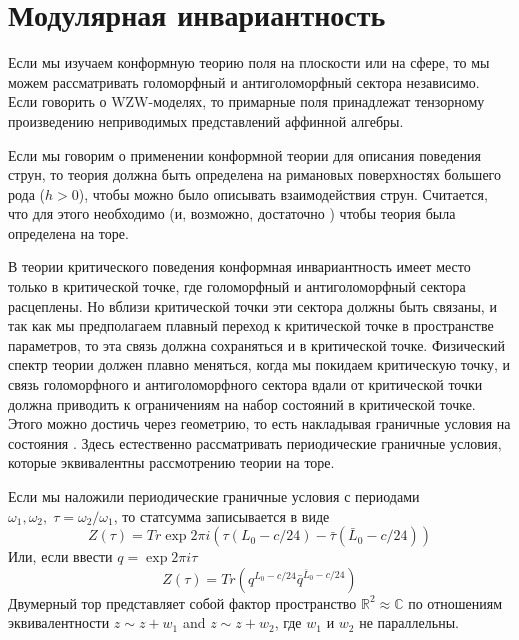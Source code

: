\documentclass[a4paper,12pt]{article}
\theoremstyle{definition} \newtheorem{Def}{Definition}
\begin{document}
\tableofcontents

\section{Модулярная инвариантность}
\label{sec:modular-invariance}

Если мы изучаем конформную теорию поля на плоскости или на сфере, то мы можем рассматривать голоморфный и антиголоморфный сектора независимо. Если говорить о WZW-моделях, то примарные поля принадлежат тензорному произведению неприводимых представлений аффинной алгебры.

Если мы говорим о применении конформной теории для описания поведения струн, то теория должна быть определена на римановых поверхностях большего рода ($h>0$), чтобы можно было описывать взаимодействия струн. Считается, что для этого необходимо (и, возможно, достаточно \cite{gaberdiel2000icf}) чтобы теория была определена на торе. 

В теории критического поведения конформная инвариантность имеет место только в критической точке, где голоморфный и антиголоморфный сектора расцеплены. Но вблизи критической точки эти сектора должны быть связаны, и так как мы предполагаем плавный переход к критической точке в пространстве параметров, то эта связь должна сохраняться и в критической точке. Физический спектр теории должен плавно меняться, когда мы покидаем критическую точку, и связь голоморфного и антиголоморфного сектора вдали от критической точки должна приводить к ограничениям на набор состояний в критической точке. Этого можно достичь через геометрию, то есть накладывая граничные условия на состояния \cite{difrancesco1997cft}. Здесь естественно рассматривать периодические граничные условия, которые эквивалентны рассмотрению теории на торе.

Если мы наложили периодические граничные условия с периодами $\omega_1, \omega_2,\; \tau=\omega_2/\omega_1$, то статсумма записывается в виде
\begin{equation}
  \label{eq:1}
  Z(\tau)=Tr \exp 2\pi i (\tau (L_0-c/24)-\bar{\tau} (\bar{L}_0-c/24))
\end{equation}
Или, если ввести $q=\exp 2\pi i \tau$
\begin{equation}
  \label{eq:2}
  Z(\tau)=Tr \left (q^{L_0-c/24}\bar{q}^{\bar{L}_0-c/24}\right)
\end{equation}
Двумерный тор представляет собой фактор пространство $\mathbb{R}^2\approx \mathbb{C}$ по отношениям эквивалентности $z\sim z+w_1$ and $z\sim z+w_2$, где $w_1$ и $w_2$ не параллельны. 
\end{document}
